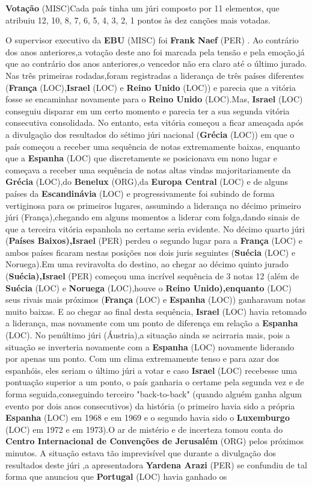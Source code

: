 \documentclass[12pt,a4paper]{article}
\begin{document}
\textbf{Votação} (MISC)Cada país tinha um júri composto por 11 elementos, que atribuiu 12, 10, 8, 7, 6, 5, 4, 3, 2, 1 pontos às dez canções mais votadas.

O supervisor executivo da \textbf{EBU} (MISC) foi \textbf{Frank Naef} (PER) . Ao contrário dos anos anteriores,a votação deste ano foi marcada pela tensão e pela emoção,já que ao contrário dos anos anteriores,o vencedor não era claro até o último jurado. Nas três primeiras rodadas,foram registradas a liderança de três países diferentes (\textbf{França} (LOC),\textbf{Israel} (LOC) e \textbf{Reino Unido} (LOC)) e parecia que a vitória fosse se encaminhar novamente para o \textbf{Reino Unido} (LOC).Mas, \textbf{Israel} (LOC) conseguiu disparar em um certo momento e parecia ter a sua segunda vitória consecutiva consolidada. No entanto, esta vitória começou a ficar ameaçada após a divulgação dos resultados do sétimo júri nacional (\textbf{Grécia} (LOC)) em que o país começou a receber uma sequência de notas extremamente baixas, enquanto que a \textbf{Espanha} (LOC) que discretamente se posicionava em nono lugar e começava a receber uma sequência de notas altas vindas majoritariamente da \textbf{Grécia} (LOC),do \textbf{Benelux} (ORG),da \textbf{Europa Central} (LOC) e de alguns países da \textbf{Escandinávia} (LOC) e progressivamente foi subindo de forma vertiginosa para os primeiros lugares, assumindo a liderança no décimo primeiro júri (França),chegando em alguns momentos a liderar com folga,dando sinais de que a terceira vitória espanhola no certame seria evidente. No décimo quarto júri (\textbf{Países Baixos),Israel} (PER) perdeu o segundo lugar para a \textbf{França} (LOC) e ambos países ficaram nestas posições nos dois juris seguintes (\textbf{Suécia} (LOC) e Noruega).Em uma reviravolta do destino, ao chegar ao décimo quinto jurado (\textbf{Suécia),Israel} (PER) começou uma incrível sequência de 3 notas 12 (além de \textbf{Suécia} (LOC) e \textbf{Noruega} (LOC),houve o \textbf{Reino Unido),enquanto} (LOC) seus rivais mais próximos (\textbf{França} (LOC) e \textbf{Espanha} (LOC)) ganharavam notas muito baixas. E ao chegar ao final desta sequência, \textbf{Israel} (LOC) havia retomado a liderança, mas novamente com um ponto de diferença em relação a \textbf{Espanha} (LOC). No penúltimo júri (Áustria),a situação ainda se acirraria mais, pois a situação se inverteria novamente com a \textbf{Espanha} (LOC) novamente liderando por apenas um ponto. Com um clima extremamente tenso e para azar dos espanhóis, eles seriam o último júri a votar e caso \textbf{Israel} (LOC) recebesse uma pontuação superior a um ponto, o país ganharia o certame pela segunda vez e de forma seguida,conseguindo terceiro "back-to-back" (quando alguém ganha algum evento por dois anos consecutivos) da história (o primeiro havia sido a própria \textbf{Espanha} (LOC) em 1968 e em 1969 e o segundo havia sido o \textbf{Luxemburgo} (LOC) em 1972 e em 1973).O ar de mistério e de incerteza tomou conta do \textbf{Centro Internacional de Convenções de Jerusalém} (ORG) pelos próximos minutos. A situação estava tão imprevisível que durante a divulgação dos resultados deste júri ,a apresentadora \textbf{Yardena Arazi} (PER) se confundiu de tal forma que anunciou que \textbf{Portugal} (LOC) havia ganhado os 
\end{document}
